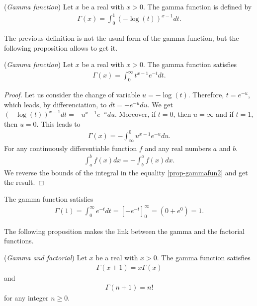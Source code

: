 \begin{definition}
(\emph{Gamma function})
\label{section-defgammafun}
Let $x$ be a real with $x>0$. The gamma function is defined by 
\begin{eqnarray}
\Gamma(x) = \int_0^1 (-\log(t))^{x-1} dt. \label{section-defgammafun1}
\end{eqnarray}
\end{definition}

The previous definition is not the usual form of the gamma function, 
but the following proposition allows to get it.

\begin{proposition}
(\emph{Gamma function})
\label{prop-gammafun}
Let $x$ be a real with $x>0$. The gamma function satisfies
\begin{eqnarray}
\Gamma(x) = \int_0^\infty t^{x-1} e^{-t} dt. \label{prop-gammafun1}
\end{eqnarray}
\end{proposition}

\begin{proof}
Let us consider the change of variable $u = -\log(t)$.
Therefore, $t = e^{-u}$, which leads, by differenciation, to $dt = -e^{-u} du$.
We get $(-\log(t))^{x-1} dt = -u^{x-1} e^{-u} du$.
Moreover, if $t=0$, then $u = \infty$ and if $t=1$, then $u = 0$.
This leads to 
\begin{eqnarray}
\Gamma(x) = - \int_\infty^0 u^{x-1} e^{-u} du. \label{prop-gammafun2}
\end{eqnarray}
For any continuously differentiable function $f$ and 
any real numbers $a$ and $b$.
\begin{eqnarray}
\int_a^b f(x) dx = - \int_b^a f(x) dx.
\end{eqnarray}
We reverse the bounds of the integral in the equality \ref{prop-gammafun2} 
and get the result.
\end{proof}

The gamma function satisfies 
\begin{eqnarray}
\Gamma(1) = \int_0^\infty e^{-t} dt = \left[-e^{-t}\right]_0^\infty = (0+e^0) = 1. 
\end{eqnarray}

The following proposition makes the link between the gamma and the factorial 
functions.

\begin{proposition}
(\emph{Gamma and factorial})
\label{prop-gammafact}
Let $x$ be a real with $x>0$. The gamma function satisfies
\begin{eqnarray}
\Gamma(x+1) = x \Gamma(x) \label{prop-gammafact1}
\end{eqnarray}
and 
\begin{eqnarray}
\Gamma(n+1) = n! \label{prop-gammafact2}
\end{eqnarray}
for any integer $n\geq 0$.
\end{proposition}

